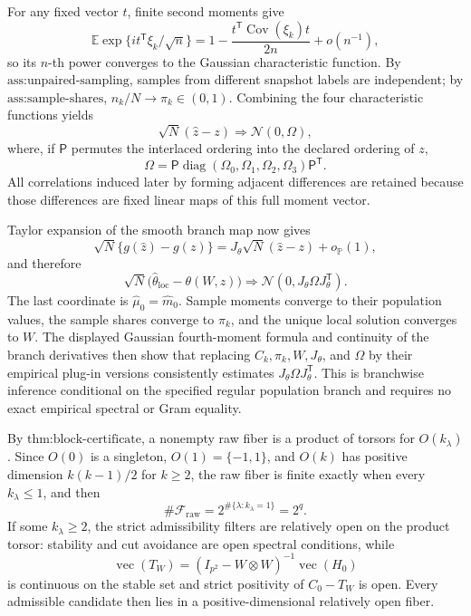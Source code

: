 For any fixed vector \(t\), finite second moments give
\[
 \mathbb E\exp\{it^{\mathsf T}\xi_k/\sqrt n\}
 =1-\frac{t^{\mathsf T}\operatorname{Cov}(\xi_k)t}{2n}+o(n^{-1}),
\]
so its \(n\)-th power converges to the Gaussian characteristic function.  By \(\text{ass:unpaired-sampling}\), samples from different snapshot labels are independent; by \(\text{ass:sample-shares}\), \(n_k/N\to\pi_k\in(0,1)\).  Combining the four characteristic functions yields
\[
 \sqrt N(\widehat z-z)\Longrightarrow\mathcal N(0,\Omega),
\]
where, if \(\mathsf P\) permutes the interlaced ordering into the declared ordering of \(z\),
\[
 \Omega=\mathsf P\operatorname{diag}(\Omega_0,\Omega_1,\Omega_2,\Omega_3)\mathsf P^{\mathsf T}.
\]
All correlations induced later by forming adjacent differences are retained because those differences are fixed linear maps of this full moment vector.

Taylor expansion of the smooth branch map now gives
\[
 \sqrt N\{g(\widehat z)-g(z)\}
 =J_\theta\sqrt N(\widehat z-z)+o_{\mathbb P}(1),
\]
and therefore
\[
 \sqrt N\bigl(\widehat\theta_{\mathrm{loc}}-\theta(W,z)\bigr)
 \Longrightarrow\mathcal N(0,J_\theta\Omega J_\theta^{\mathsf T}).
\]
The last coordinate is \(\widehat\mu_0=\widehat m_0\).  Sample moments converge to their population values, the sample shares converge to \(\pi_k\), and the unique local solution converges to \(W\).  The displayed Gaussian fourth-moment formula and continuity of the branch derivatives then show that replacing \(C_k,\pi_k,W,J_\theta\), and \(\Omega\) by their empirical plug-in versions consistently estimates \(J_\theta\Omega J_\theta^{\mathsf T}\).  This is branchwise inference conditional on the specified regular population branch and requires no exact empirical spectral or Gram equality.

By \(\text{thm:block-certificate}\), a nonempty raw fiber is a product of torsors for \(O(k_\lambda)\).  Since \(O(0)\) is a singleton, \(O(1)=\{-1,1\}\), and \(O(k)\) has positive dimension \(k(k-1)/2\) for \(k\ge2\), the raw fiber is finite exactly when every \(k_\lambda\leq1\), and then
\[
 \#\mathcal F_{\mathrm{raw}}=2^{\#\{\lambda:k_\lambda=1\}}=2^q.
\]
If some \(k_\lambda\ge2\), the strict admissibility filters are relatively open on the product torsor: stability and cut avoidance are open spectral conditions, while
\[
 \operatorname{vec}(T_W)=(I_{p^2}-W\otimes W)^{-1}\operatorname{vec}(H_0)
\]
is continuous on the stable set and strict positivity of \(C_0-T_W\) is open.  Every admissible candidate then lies in a positive-dimensional relatively open fiber.

